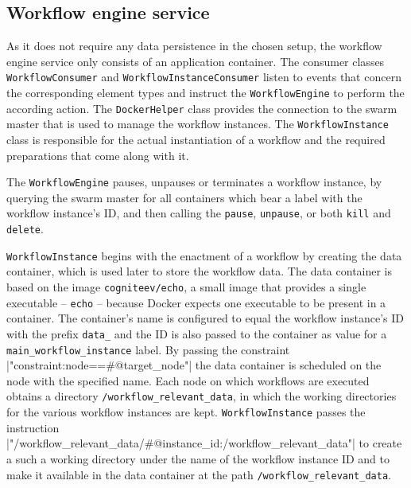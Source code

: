   \subsection{Workflow engine service} %
    \label{sub:workflow_engine_service}
    As it does not require any data persistence in the chosen setup, the workflow engine service only consists of an application container. The consumer classes \texttt{WorkflowConsumer} and \texttt{WorkflowInstanceConsumer} listen to events that concern the corresponding element types and instruct the \texttt{WorkflowEngine} to perform the according action. The \texttt{DockerHelper} class provides the connection to the swarm master that is used to manage the workflow instances.
    The \texttt{WorkflowInstance} class is responsible for the actual instantiation of a workflow and the required preparations that come along with it.

    The \texttt{WorkflowEngine} pauses, unpauses or terminates a workflow instance, by querying the swarm master for all containers which bear a label with the workflow instance's \ac{ID}, and then calling the  \texttt{pause}, \texttt{unpause}, or both \texttt{kill} and \texttt{delete}.

    \texttt{WorkflowInstance} begins with the enactment of a workflow by creating the data container, which is used later to store the workflow data. The data container is based on the image \texttt{cogniteev/echo}, a small image that provides a single executable -- \texttt{echo} -- because Docker expects one executable to be present in a container. The container's name is configured to equal the workflow instance's \ac{ID} with the prefix \texttt{data\_} and the \ac{ID} is also passed to the container as value for a \texttt{main\_workflow\_instance} label.
    By passing the constraint
    |"constraint:node==#{@target_node}"|
    the data container is scheduled on the node with the specified name. Each node on which workflows are executed obtains a directory \texttt{/workflow\_relevant\_data}, in which the working directories for the various workflow instances are kept. \texttt{WorkflowInstance} passes the instruction
    |"/workflow_relevant_data/#{@instance_id}:/workflow_relevant_data"|
    to create a such a working directory under the name of the workflow instance \ac{ID} and to make it available in the data container at the path \texttt{/workflow\_relevant\_data}.

